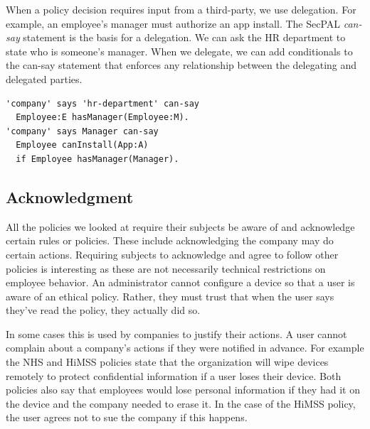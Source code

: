 \documentclass[thesis.tex]{subfiles}
\begin{document}
When a policy decision requires input from a third-party, we use delegation.
For example, an employee's manager must authorize an app install.
The SecPAL \emph{can-say} statement is the basis for a delegation.
We can ask the HR department to state who is someone's manager.
When we delegate, we can add conditionals to the can-say
statement that enforces any relationship between the delegating and
delegated parties.

\begin{lstlisting}
'company' says 'hr-department' can-say
  Employee:E hasManager(Employee:M).
'company' says Manager can-say
  Employee canInstall(App:A)
  if Employee hasManager(Manager).
\end{lstlisting}

\subsection{Acknowledgment}

All the policies we looked at require their subjects be aware of and acknowledge
certain rules or policies. These include acknowledging the company may do
certain actions. Requiring subjects to acknowledge and agree to follow other
policies is interesting as these are not necessarily technical restrictions on
employee behavior. An administrator cannot configure a device so that a user is
aware of an ethical policy. Rather, they must trust that when the
user says they've read the policy, they actually did so.

In some cases this is used by companies to justify their actions.  A
user cannot complain about a company's actions if they were notified
in advance.  For example the NHS and \ac{HiMSS} policies state that
the organization will wipe devices remotely to protect confidential
information if a user loses their device.  Both policies also say that
employees would lose personal information if they had it on the device
and the company needed to erase it.  In the case of the \ac{HiMSS} policy, the user agrees not to
sue the company if this happens.
\end{document}
